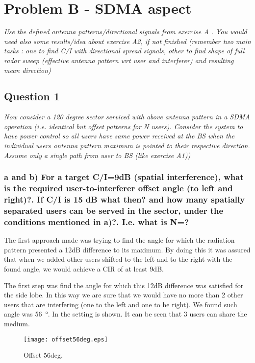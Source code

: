 \section{Problem B - SDMA aspect}
\textit{Use the defined antenna patterns/directional signals from exercise A . You would need also some results/idea about exercise A2, if not finished (remember two main tasks : one to find C/I with directional spread signals, other to find shape of full radar sweep (effective antenna pattern wrt user and interferer) and resulting mean direction)}

\subsection{Question 1}
\textit{Now consider a 120 degree sector serviced with above antenna pattern in a SDMA operation (i.e. identical but offset patterns for N users). Consider the system to have power control so all users have same power received at the BS when the individual users antenna pattern maximum is pointed to their respective direction. Assume only a single path from user to BS (like exercise A1))}

\subsubsection{a and b) For a target C/I=9dB (spatial interference), what is the required user-to-interferer offset angle (to left and right)?. If C/I is 15 dB what then? and how many spatially separated users can be served in the sector, under the conditions mentioned in a)?. I.e. what is N=?}

The first approach made was trying to find the angle for which the radiation pattern presented a 12dB difference to its maximum. By doing this it was assured that when we added other users shifted to the left and to the right with the found angle, we would achieve a CIR of at least 9dB.

The first step was find the angle for which this 12dB difference was satisfied for the side lobe. In this way we are sure that we would have no more than 2 other users that are interfering (one to the left and one to he right). We found such angle was \SI{56}{\degree}. In  the setting is shown. It can be seen that 3 users can share the medium.

\begin{figure}[!h]
  \centering
  \texttt{[image: offset56deg.eps]}
  \caption{Offset 56deg.}
  \label{fig:offset56deg}
\end{figure}

